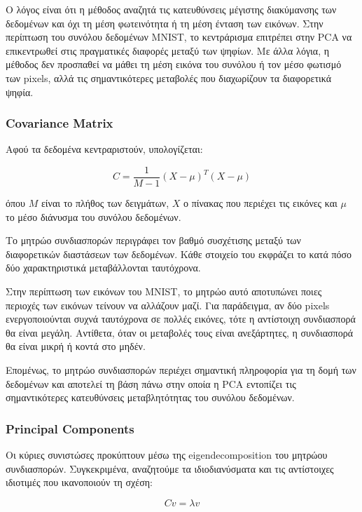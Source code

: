 \documentclass[12pt]{article}
\begin{document}
Ο λόγος είναι ότι η μέθοδος αναζητά τις κατευθύνσεις μέγιστης διακύμανσης των δεδομένων και όχι τη μέση φωτεινότητα ή τη μέση ένταση των εικόνων. Στην 
περίπτωση του συνόλου δεδομένων MNIST, το κεντράρισμα επιτρέπει στην PCA να επικεντρωθεί στις πραγματικές διαφορές μεταξύ των ψηφίων. Με άλλα λόγια, η 
μέθοδος δεν προσπαθεί να μάθει τη μέση εικόνα του συνόλου ή τον μέσο φωτισμό των pixels, αλλά τις σημαντικότερες μεταβολές που διαχωρίζουν τα διαφορετικά 
ψηφία.

\subsubsection{Covariance Matrix}
Αφού τα δεδομένα κεντραριστούν, υπολογίζεται:

\begin{equation}
C = \frac{1}{M-1}(X-\mu)^T(X-\mu)
\end{equation}

όπου $M$ είναι το πλήθος των δειγμάτων, $X$ ο πίνακας που περιέχει τις εικόνες και $\mu$ το μέσο διάνυσμα του συνόλου δεδομένων.

Το μητρώο συνδιασπορών περιγράφει τον βαθμό συσχέτισης μεταξύ των διαφορετικών διαστάσεων των δεδομένων. Κάθε στοιχείο του εκφράζει το κατά πόσο δύο 
χαρακτηριστικά μεταβάλλονται ταυτόχρονα.

Στην περίπτωση των εικόνων του MNIST, το μητρώο αυτό αποτυπώνει ποιες περιοχές των εικόνων τείνουν να αλλάζουν μαζί. Για παράδειγμα, αν δύο pixels 
ενεργοποιούνται συχνά ταυτόχρονα σε πολλές εικόνες, τότε η αντίστοιχη συνδιασπορά θα είναι μεγάλη. Αντίθετα, όταν οι μεταβολές τους είναι ανεξάρτητες, 
η συνδιασπορά θα είναι μικρή ή κοντά στο μηδέν.

Επομένως, το μητρώο συνδιασπορών περιέχει σημαντική πληροφορία για τη δομή των δεδομένων και αποτελεί τη βάση πάνω στην οποία η PCA εντοπίζει τις 
σημαντικότερες κατευθύνσεις μεταβλητότητας του συνόλου δεδομένων.

\subsubsection{Principal Components}
Οι κύριες συνιστώσες προκύπτουν μέσω της eigendecomposition του μητρώου συνδιασπορών. Συγκεκριμένα, αναζητούμε τα ιδιοδιανύσματα και τις αντίστοιχες 
ιδιοτιμές που ικανοποιούν τη σχέση:

\begin{equation}
Cv = \lambda v
\end{equation}
\end{document}
